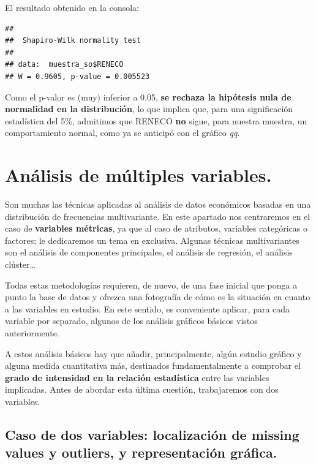 \documentclass[
]{book}
\newenvironment{Shaded}{\begin{snugshade}}{\end{snugshade}}
\newcommand{\AttributeTok}[1]{\textcolor[rgb]{0.13,0.29,0.53}{#1}}
\newcommand{\FunctionTok}[1]{\textcolor[rgb]{0.13,0.29,0.53}{\textbf{#1}}}
\newcommand{\NormalTok}[1]{#1}
\newcommand{\SpecialCharTok}[1]{\textcolor[rgb]{0.81,0.36,0.00}{\textbf{#1}}}
\begin{document}
\begin{Shaded}
\end{Shaded}

El resultado obtenido en la consola:

\begin{verbatim}
## 
##  Shapiro-Wilk normality test
## 
## data:  muestra_so$RENECO
## W = 0.9605, p-value = 0.005523
\end{verbatim}

Como el p-valor es (muy) inferior a 0.05, \textbf{se rechaza la hipótesis nula de normalidad en la distribución}, lo que implica que, para una significación estadística del 5\%, admitimos que RENECO \textbf{no} sigue, para nuestra muestra, un comportamiento normal, como ya se anticipó con el gráfico \emph{qq}.

\section{Análisis de múltiples variables.}\label{anuxe1lisis-de-muxfaltiples-variables.}

Son muchas las técnicas aplicadas al análisis de datos económicos basadas en una distribución de frecuencias multivariante. En este apartado nos centraremos en el caso de \textbf{variables métricas}, ya que al caso de atributos, variables categóricas o factores; le dedicaremos un tema en exclusiva. Algunas técnicas multivariantes son el análisis de componentes principales, el análisis de regresión, el análisis clúster\ldots{}

Todas estas metodologías requieren, de nuevo, de una fase inicial que ponga a punto la base de datos y ofrezca una fotografía de cómo es la situación en cuanto a las variables en estudio. En este sentido, es conveniente aplicar, para cada variable por separado, algunos de los análisis gráficos básicos vistos anteriormente.

A estos análisis básicos hay que añadir, principalmente, algún estudio gráfico y alguna medida cuantitativa más, destinados fundamentalmente a comprobar el \textbf{grado de intensidad en la relación estadística} entre las variables implicadas. Antes de abordar esta última cuestión, trabajaremos con dos variables.

\subsection{Caso de dos variables: localización de missing values y outliers, y representación gráfica.}\label{caso-de-dos-variables-localizaciuxf3n-de-missing-values-y-outliers-y-representaciuxf3n-gruxe1fica.}
\end{document}
